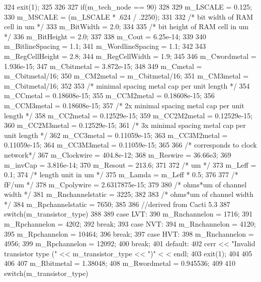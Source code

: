 \begin{DoxyCode}
{{324         exit(1);
325     }
326 
327     if(m_tech_node == 90)
328     {
329         m_LSCALE = 0.125;
330         m_MSCALE = (m_LSCALE * .624 / .2250);
331 
332         /* bit width of RAM cell in um */
333         m_BitWidth = 2.0;
334 
335         /* bit height of RAM cell in um */
336         m_BitHeight = 2.0;
337 
338         m_Cout = 6.25e-14;
339 
340         m_BitlineSpacing = 1.1;
341         m_WordlineSpacing = 1.1;
342 
343         m_RegCellHeight = 2.8;
344         m_RegCellWidth = 1.9;
345 
346         m_Cwordmetal = 1.936e-15;
347         m_Cbitmetal = 3.872e-15;
348 
349         m_Cmetal = m_Cbitmetal/16;
350         m_CM2metal = m_Cbitmetal/16;
351         m_CM3metal = m_Cbitmetal/16;
352 
353         /* minimal spacing metal cap per unit length */
354         m_CCmetal = 0.18608e-15;
355         m_CCM2metal = 0.18608e-15;
356         m_CCM3metal = 0.18608e-15;
357         /* 2x minimal spacing metal cap per unit length */
358         m_CC2metal = 0.12529e-15;
359         m_CC2M2metal = 0.12529e-15;
360         m_CC2M3metal = 0.12529e-15;
361         /* 3x minimal spacing metal cap per unit length */
362         m_CC3metal = 0.11059e-15;
363         m_CC3M2metal = 0.11059e-15;
364         m_CC3M3metal = 0.11059e-15;
365 
366         /* corresponds to clock network*/
367         m_Clockwire = 404.8e-12;
368         m_Reswire = 36.66e3;
369         m_invCap = 3.816e-14;
370         m_Resout = 213.6;
371 
372         /* um */
373         m_Leff = 0.1;
374         /* length unit in um */
375         m_Lamda = m_Leff * 0.5;
376 
377         /* fF/um */
378         m_Cpolywire = 2.6317875e-15;
379 
380         /* ohms*um of channel width */
381         m_Rnchannelstatic = 3225;
382 
383         /* ohms*um of channel width */
384         m_Rpchannelstatic = 7650;
385 
386         //derived from Cacti 5.3
387         switch(m_transistor_type)
388         {
389             case LVT:
390                 m_Rnchannelon = 1716;
391                 m_Rpchannelon = 4202;
392                 break;
393             case NVT:
394                 m_Rnchannelon = 4120;
395                 m_Rpchannelon = 10464;
396                 break;
397             case HVT:
398                 m_Rnchannelon = 4956;
399                 m_Rpchannelon = 12092;
400                 break;
401             default:
402                 cerr << "Invalid transistor type (" << m_transistor_type << ")" <
      < endl;
403                 exit(1);
404         }
405 
406 
407         m_Rbitmetal = 1.38048;
408         m_Rwordmetal = 0.945536;
409 
410         switch(m_transistor_type)
}}
\end{DoxyCode}

